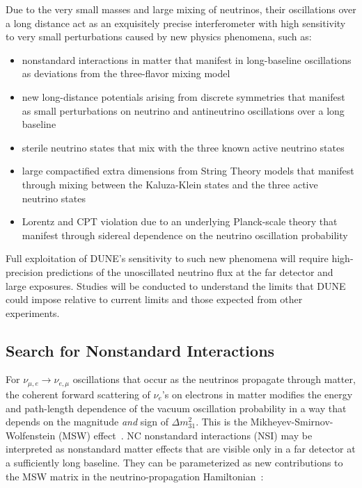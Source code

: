 Due to the very small masses and large mixing of neutrinos, their oscillations over a long distance
  act as an exquisitely precise interferometer with high sensitivity to very small perturbations caused by 
  new physics phenomena, such as:
  \begin{itemize}
  \item nonstandard interactions in matter that manifest in
    long-baseline oscillations as deviations from the three-flavor mixing model
  \item new long-distance potentials arising from discrete symmetries
    that manifest as small perturbations on neutrino and antineutrino
    oscillations over a long baseline
  \item sterile neutrino states that mix with the three known active neutrino states
  \item large compactified extra dimensions from String Theory models that manifest through mixing
    between the Kaluza-Klein states and the three active neutrino
    states
   \item Lorentz and CPT violation due to an underlying Planck-scale theory that manifest through sidereal dependence on the neutrino oscillation probability
  \end{itemize}
    Full exploitation of DUNE's sensitivity to such new phenomena
  will require high-precision predictions of the unoscillated
  neutrino flux at the far detector and large exposures. Studies will be conducted to understand the
limits that DUNE could impose relative to current limits and those expected from other experiments.
  
\subsection{Search for Nonstandard Interactions}

For $\nu_{\mu,e} \rightarrow \nu_{e,\mu}$ 
oscillations that occur as the neutrinos propagate through matter,  
the coherent forward scattering of $\nu_e$'s on electrons in matter 
modifies the energy and path-length dependence of the vacuum oscillation 
probability in a way that depends on the magnitude \emph{and} sign of $\Delta m^2_{31}$. 
This is  the Mikheyev-Smirnov-Wolfenstein (MSW) effect~\cite{Mikheev:1986gs,Wolfenstein:1977ue}.
NC nonstandard interactions (NSI) may be interpreted as nonstandard
matter effects that are visible only in a far detector at a
sufficiently long baseline. 
They can be parameterized as new contributions
to the MSW matrix in the neutrino-propagation Hamiltonian~\cite{Valle:1987gv,Roulet:1991sm}:

